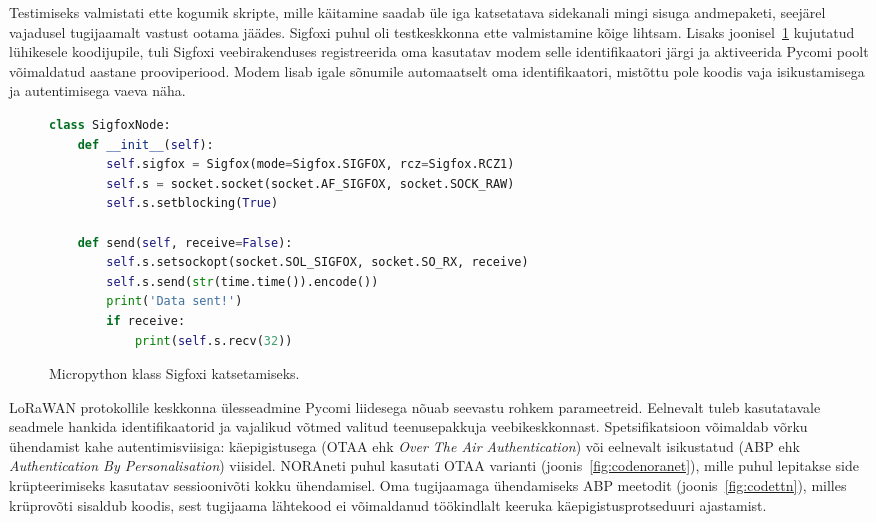 \documentclass[12pt]{article}
\begin{document}
    Testimiseks valmistati ette kogumik skripte, mille käitamine saadab üle iga katsetatava sidekanali mingi sisuga andmepaketi, seejärel vajadusel tugijaamalt vastust ootama jäädes.
    Sigfoxi puhul oli testkeskkonna ette valmistamine kõige lihtsam.
    Lisaks joonisel~\ref{fig:codesigfox} kujutatud lühikesele koodijupile, tuli Sigfoxi veebirakenduses registreerida oma kasutatav modem selle identifikaatori järgi ja aktiveerida Pycomi poolt võimaldatud aastane prooviperiood.
    Modem lisab igale sõnumile automaatselt oma identifikaatori, mistõttu pole koodis vaja isikustamisega ja autentimisega vaeva näha.
    \begin{figure}[h]
    \begin{spacing}{0.8}
    \begin{lstlisting}[language=Python]
class SigfoxNode:
    def __init__(self):
        self.sigfox = Sigfox(mode=Sigfox.SIGFOX, rcz=Sigfox.RCZ1)
        self.s = socket.socket(socket.AF_SIGFOX, socket.SOCK_RAW)
        self.s.setblocking(True)

    def send(self, receive=False):
        self.s.setsockopt(socket.SOL_SIGFOX, socket.SO_RX, receive)
        self.s.send(str(time.time()).encode())
        print('Data sent!')
        if receive:
            print(self.s.recv(32))
    \end{lstlisting}
    \end{spacing}
    \caption{Micropython klass Sigfoxi katsetamiseks.}
    \label{fig:codesigfox}
    \end{figure}

    LoRaWAN protokollile keskkonna ülesseadmine Pycomi liidesega nõuab seevastu rohkem parameetreid.
    Eelnevalt tuleb kasutatavale seadmele hankida identifikaatorid ja vajalikud võtmed valitud teenusepakkuja veebikeskkonnast.
    Spetsifikatsioon võimaldab võrku ühendamist kahe autentimisviisiga: käepigistusega (OTAA ehk \textit{Over The Air Authentication}) või eelnevalt isikustatud (ABP ehk \textit{Authentication By Personalisation}) viisidel.
    NORAneti puhul kasutati OTAA varianti (joonis~\ref{fig:codenoranet}), mille puhul lepitakse side krüpteerimiseks kasutatav sessioonivõti kokku ühendamisel.
    Oma tugijaamaga ühendamiseks ABP meetodit (joonis~\ref{fig:codettn}), milles krüprovõti sisaldub koodis, sest tugijaama lähtekood ei võimaldanud töökindlalt keeruka käepigistusprotseduuri ajastamist.
\end{document}
